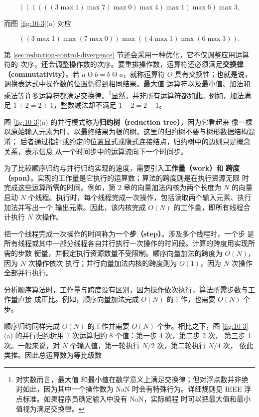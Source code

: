 \[
  ((((((3\mathbin{\max}1)\mathbin{\max}7)\mathbin{\max}0)
  \mathbin{\max}4)\mathbin{\max}1)\mathbin{\max}6)\mathbin{\max}3,
\]

而图 \ref{fig:10-3}(a) 对应

\[
  ((3\mathbin{\max}1)\mathbin{\max}(7\mathbin{\max}0))
  \mathbin{\max}((4\mathbin{\max}1)\mathbin{\max}(6\mathbin{\max}3)).
\]

第 \ref{sec:reduction-control-divergence} 节还会采用一种优化，它不仅调整应用运算符的
次序，还会调整操作数的次序。要重排操作数，运算符还必须满足\textbf{交换律
（commutativity）}。若 $a\mathbin{\Theta}b=b\mathbin{\Theta}a$，就称运算符
$\Theta$ 具有交换性；也就是说，调换表达式中操作数的位置仍得到相同结果。最大值
运算符以及最小值、加法和乘法等许多运算符都满足交换律。\footnote{对实数而言，最大值
和最小值在数学意义上满足交换律；但对浮点数并非绝对如此，因为其中一个操作数为 NaN
时会有特殊行为。详细规则见 IEEE 浮点标准。如果程序员确定输入中没有 NaN，实际编程
时可以把最大值和最小值视为满足交换律。}显然，并非所有运算符都如此。例如，加法满足
$1+2=2+1$，整数减法却不满足 $1-2=2-1$。

图 \ref{fig:10-3}(a) 的并行模式称为\textbf{归约树（reduction tree）}，因为它看起来
像一棵以原始输入元素为叶、以最终结果为根的树。这里的归约树不要与树形数据结构混淆；
后者通过指针或约定的位置显式或隐式连接结点，归约树中的边则只是概念关系，表示信息
从一个时间步中的运算流向下一个时间步。

为了比较顺序归约与并行归约实现的速度，需要引入\textbf{工作量（work）}和
\textbf{跨度（span）}。实现的工作量是它执行的运算数；算法的跨度则是在执行资源无限
时完成这些运算所需的时间。例如，第 2 章的向量加法内核为两个长度为 $N$ 的向量启动
$N$ 个线程。执行时，每个线程完成一次操作，包括读取两个输入元素、执行加法并写出一个
输出元素。因此，该内核完成 $O(N)$ 的工作量，即所有线程合计执行 $N$ 次操作。

把一个线程完成一次操作的时间称为一个\textbf{步（step）}。涉及多个线程时，一个步
是所有线程或其中一部分线程各自并行执行一次操作的时间段。计算的跨度用实现所需的步数
衡量，并假定执行资源数量不受限制。顺序向量加法的跨度为 $O(N)$，因为 $N$ 次操作依次
执行；并行向量加法内核的跨度则为 $O(1)$，因为 $N$ 次操作全部并行执行。

分析顺序算法时，工作量与跨度没有区别，因为操作依次执行，算法所需步数与工作量直接
成正比。例如，顺序向量加法完成 $O(N)$ 的工作，也需要 $O(N)$ 个步。

顺序归约同样完成 $O(N)$ 的工作并需要 $O(N)$ 个步。相比之下，图
\ref{fig:10-3}(a) 的并行归约树用 7 次运算归约 8 个值：第一步 4 次，第二步 2 次，
第三步 1 次。一般来说，对 $N$ 个输入值，第一轮执行 $N/2$ 次，第二轮执行 $N/4$ 次，
依此类推。因此总运算数为等比级数

